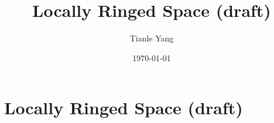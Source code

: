 \documentclass{noteformyself}
\title{Locally Ringed Space (draft)}
\author{Tianle Yang}
\date{\today}
\begin{document}
    \maketitle

    \section{Locally Ringed Space (draft)}



\end{document}
